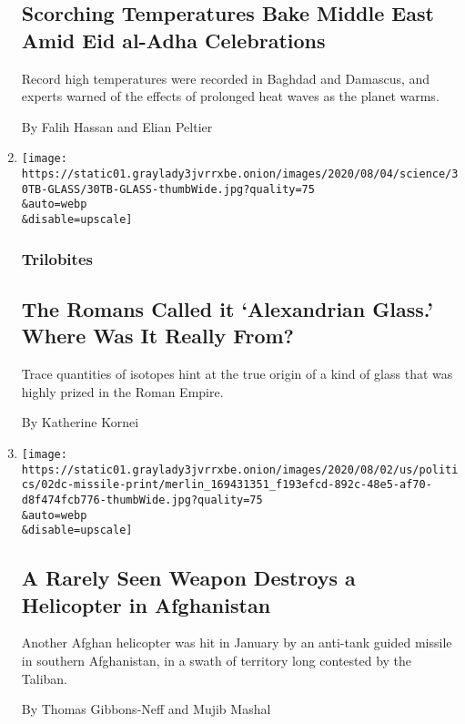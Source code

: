 \begin{enumerate}
  \hypertarget{scorching-temperatures-bake-middle-east-amid-eid-al-adha-celebrations}{%
  \subsection{Scorching Temperatures Bake Middle East Amid Eid al-Adha
  Celebrations}\label{scorching-temperatures-bake-middle-east-amid-eid-al-adha-celebrations}}

  Record high temperatures were recorded in Baghdad and Damascus, and
  experts warned of the effects of prolonged heat waves as the planet
  warms.

  By Falih Hassan and Elian Peltier
\item
  \href{/2020/07/31/science/alexandrian-glass-rome.html}{}

  \texttt{[image: https://static01.graylady3jvrrxbe.onion/images/2020/08/04/science/30TB-GLASS/30TB-GLASS-thumbWide.jpg?quality=75\\\&auto=webp\\\&disable=upscale]}

  \hypertarget{trilobites}{%
  \subsubsection{Trilobites}\label{trilobites}}

  \hypertarget{the-romans-called-it-alexandrian-glass-where-was-it-really-from}{%
  \subsection{The Romans Called it `Alexandrian Glass.' Where Was It
  Really
  From?}\label{the-romans-called-it-alexandrian-glass-where-was-it-really-from}}

  Trace quantities of isotopes hint at the true origin of a kind of
  glass that was highly prized in the Roman Empire.

  By Katherine Kornei
\item
  \href{/2020/07/30/world/asia/afghanistan-taliban-helicopter-missile.html}{}

  \texttt{[image: https://static01.graylady3jvrrxbe.onion/images/2020/08/02/us/politics/02dc-missile-print/merlin\_169431351\_f193efcd-892c-48e5-af70-d8f474fcb776-thumbWide.jpg?quality=75\\\&auto=webp\\\&disable=upscale]}

  \hypertarget{a-rarely-seen-weapon-destroys-a-helicopter-in-afghanistan}{%
  \subsection{A Rarely Seen Weapon Destroys a Helicopter in
  Afghanistan}\label{a-rarely-seen-weapon-destroys-a-helicopter-in-afghanistan}}

  Another Afghan helicopter was hit in January by an anti-tank guided
  missile in southern Afghanistan, in a swath of territory long
  contested by the Taliban.

  By Thomas Gibbons-Neff and Mujib Mashal
\end{enumerate}

